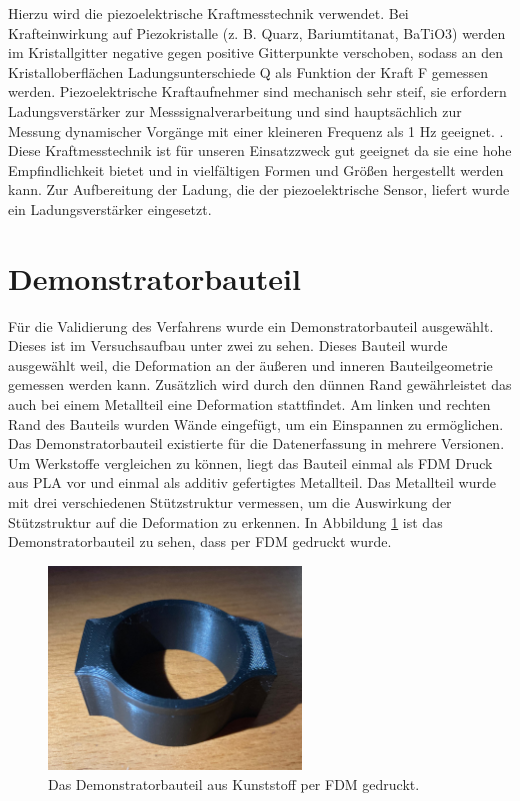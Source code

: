 Hierzu wird die piezoelektrische Kraftmesstechnik verwendet.
Bei Krafteinwirkung auf Piezokristalle (z. B. Quarz, Bariumtitanat, BaTiO3) 
werden im Kristallgitter negative gegen positive Gitterpunkte
verschoben, sodass an den Kristalloberflächen
Ladungsunterschiede Q als Funktion der Kraft F
gemessen werden.
Piezoelektrische Kraftaufnehmer sind mechanisch sehr steif, 
sie erfordern Ladungsverstärker
zur Messsignalverarbeitung und sind hauptsächlich zur Messung dynamischer Vorgänge
mit einer kleineren Frequenz als 1 Hz geeignet. \cite{Czichos.2020}. 
Diese Kraftmesstechnik ist 
für unseren Einsatzzweck gut geeignet da sie eine hohe Empfindlichkeit bietet 
und in vielfältigen Formen und Größen hergestellt werden kann. Zur Aufbereitung 
der Ladung, die der piezoelektrische Sensor, liefert wurde ein Ladungsverstärker 
eingesetzt.\cite{Schwartz.2006}

\section{Demonstratorbauteil} \label{demo_Bauteil}

Für die Validierung des Verfahrens wurde ein Demonstratorbauteil ausgewählt.
Dieses ist im Versuchsaufbau unter zwei zu sehen. Dieses Bauteil wurde ausgewählt 
weil, die Deformation an der äußeren und inneren Bauteilgeometrie gemessen werden kann.
Zusätzlich wird durch den dünnen Rand gewährleistet das auch bei einem Metallteil 
eine Deformation stattfindet. Am linken und rechten Rand des Bauteils wurden Wände 
eingefügt, um ein Einspannen zu ermöglichen.
Das Demonstratorbauteil existierte für die Datenerfassung in mehrere Versionen.
Um Werkstoffe vergleichen zu können, liegt das Bauteil einmal als FDM Druck aus PLA vor 
und einmal als additiv gefertigtes Metallteil.
Das Metallteil wurde mit drei verschiedenen Stützstruktur vermessen, um die Auswirkung 
der Stützstruktur auf die Deformation zu erkennen. In Abbildung \ref{fig:demofdm} ist 
das Demonstratorbauteil zu sehen, dass per FDM gedruckt wurde.

\begin{figure}[H]
    \centering
    \includegraphics[width=0.6\textwidth]{images/demo_fdm.jpg}
    \caption{Das Demonstratorbauteil aus Kunststoff per FDM gedruckt.}
    \label{fig:demofdm}
\end{figure}

